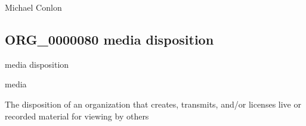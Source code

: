 \documentclass[letterpaper,10pt,english]{sphinxmanual}
\begin{document}
\begin{sphinxShadowBox}

\sphinxAtStartPar
Michael Conlon 
\end{sphinxShadowBox}
\begin{quote}

\ignorespaces \end{quote}


\subsection{ORG\_0000080 \sphinxhyphen{} media disposition}
\label{\detokenize{doc-ORG_0000080:org-0000080-media-disposition}}\label{\detokenize{doc-ORG_0000080:index-0}}\label{\detokenize{doc-ORG_0000080::doc}}
\begin{sphinxShadowBox}

\sphinxAtStartPar
media disposition
\end{sphinxShadowBox}

\begin{sphinxShadowBox}

\sphinxAtStartPar
media
\end{sphinxShadowBox}

\begin{sphinxShadowBox}

\sphinxAtStartPar
{\hyperref[\detokenize{doc-BFO_0000016::doc}]{}}
\end{sphinxShadowBox}

\begin{sphinxShadowBox}

\sphinxAtStartPar
The disposition of an organization that creates, transmits, and/or licenses live or recorded material for viewing by others
\end{sphinxShadowBox}

\begin{sphinxShadowBox}

\sphinxAtStartPar
{}
\end{sphinxShadowBox}
\end{document}
